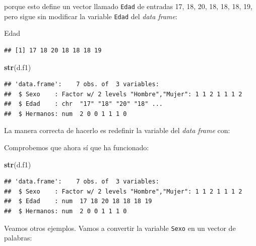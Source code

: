 \documentclass[]{book}
\newenvironment{Shaded}{\begin{snugshade}}{\end{snugshade}}
\newcommand{\KeywordTok}[1]{\textcolor[rgb]{0.13,0.29,0.53}{\textbf{#1}}}
\newcommand{\NormalTok}[1]{#1}
\newcommand{\OperatorTok}[1]{\textcolor[rgb]{0.81,0.36,0.00}{\textbf{#1}}}
\theoremstyle{definition}
\theoremstyle{definition}
\theoremstyle{definition}
\theoremstyle{remark}
\begin{document}
porque esto define un vector llamado \texttt{Edad} de entradas 17, 18, 20, 18, 18, 18, 19, pero sigue sin modificar la variable \texttt{Edad} del \emph{data frame}:

\begin{Shaded}
\begin{Highlighting}[]
\NormalTok{Edad}
\end{Highlighting}
\end{Shaded}

\begin{verbatim}
## [1] 17 18 20 18 18 18 19
\end{verbatim}

\begin{Shaded}
\begin{Highlighting}[]
\KeywordTok{str}\NormalTok{(d.f1)}
\end{Highlighting}
\end{Shaded}

\begin{verbatim}
## 'data.frame':    7 obs. of  3 variables:
##  $ Sexo    : Factor w/ 2 levels "Hombre","Mujer": 1 1 2 1 1 1 2
##  $ Edad    : chr  "17" "18" "20" "18" ...
##  $ Hermanos: num  2 0 0 1 1 1 0
\end{verbatim}

La manera correcta de hacerlo es redefinir la variable del \emph{data frame} con:

\begin{Shaded}
\end{Shaded}

Comprobemos que ahora sí que ha funcionado:

\begin{Shaded}
\begin{Highlighting}[]
\KeywordTok{str}\NormalTok{(d.f1)}
\end{Highlighting}
\end{Shaded}

\begin{verbatim}
## 'data.frame':    7 obs. of  3 variables:
##  $ Sexo    : Factor w/ 2 levels "Hombre","Mujer": 1 1 2 1 1 1 2
##  $ Edad    : num  17 18 20 18 18 18 19
##  $ Hermanos: num  2 0 0 1 1 1 0
\end{verbatim}

Veamos otros ejemplos. Vamos a convertir la variable \texttt{Sexo} en un vector de palabras:
\end{document}
